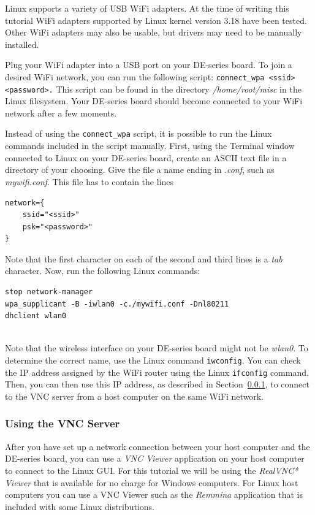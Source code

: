 \documentclass[11pt, twoside, pdftex]{article}
\begin{document}
Linux supports a variety of USB WiFi adapters. At the time of writing this
tutorial WiFi adapters supported by Linux kernel version 3.18 have been tested. Other WiFi
adapters may also be usable, but drivers may need to be manually installed.

Plug your WiFi adapter into a USB port on your DE-series board. To join a desired WiFi network, 
you can run the following script: \texttt{connect\_wpa <ssid> <password>.} This script can be found 
in the directory {\it /home/root/misc} in the Linux filesystem. Your DE-series board should 
become connected to your WiFi network after a few moments.

Instead of using the \texttt{connect\_wpa} script, it is possible to run the Linux commands
included in the script manually. First, using the Terminal window connected to Linux on
your DE-series board, create an ASCII text file in a directory of your choosing. Give the file 
a name ending in .{\it conf}, such as {\it mywifi.conf}. This file has to contain the lines

\begin{lstlisting}
network={
	ssid="<ssid>"
	psk="<password>"
}
\end{lstlisting}

Note that the first character on each of the second and third lines is a {\it tab} character.
Now, run the following Linux commands:

\begin{lstlisting}
stop network-manager
wpa_supplicant -B -iwlan0 -c./mywifi.conf -Dnl80211
dhclient wlan0
\end{lstlisting}

~\\
Note that the wireless interface on your DE-series board might not be {\it wlan0}. To
determine the correct name, use the Linux command \texttt{iwconfig}. You can check the IP address 
assigned by the WiFi router using the Linux \texttt{ifconfig} command. Then, you can then use 
this IP address, as described in Section~\ref{sec:VNC}, to connect to the VNC server from a 
host computer on the same WiFi network.

\subsubsection{Using the VNC Server}
\label{sec:VNC}
After you have set up a network connection between your host computer and the DE-series
board, you can use a {\it VNC Viewer} application on your host computer to connect to 
the Linux GUI. For this tutorial we will be using the {\it RealVNC* Viewer} that is available 
for no charge for Windows computers. For Linux host computers you can
use a VNC Viewer such as the {\it Remmina} application that is included with some Linux
distributions.
\end{document}
